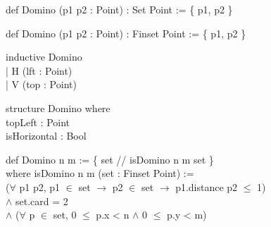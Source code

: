 \begin{leancode}
def Domino (p1 p2 : Point) : Set Point := \{ p1, p2 \}

def Domino (p1 p2 : Point) : Finset Point := \{ p1, p2 \}

inductive Domino \\
\tab | H (lft : Point) \\
\tab | V (top : Point)

structure Domino where \\
\tab topLeft : Point \\
\tab isHorizontal : Bool

def Domino n m := \{ set // isDomino n m set \} \\
where isDomino n m (set : Finset Point) := \\
\tab ($\forall$ p1 p2, p1 $\in$ set $\to$ p2 $\in$ set $\to$ p1.distance p2 $\le$ 1) \\
\tab $\land$ set.card = 2 \\
\tab $\land$ ($\forall$ p $\in$ set, 0 $\le$ p.x < n $\land$ 0 $\le$ p.y < m)
\end{leancode}
